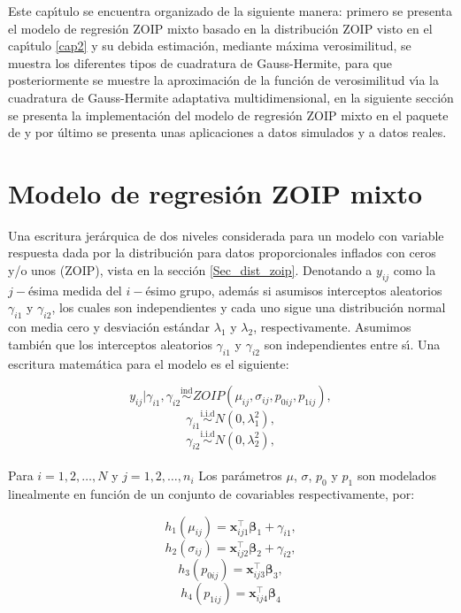 Este cap\'{\i}tulo se encuentra organizado de la siguiente manera: primero se presenta el modelo de regresi\'{o}n ZOIP mixto basado en la distribuci\'{o}n ZOIP visto en el cap\'{\i}tulo \ref{cap2} y su debida estimaci\'{o}n, mediante m\'{a}xima verosimilitud, se muestra los diferentes tipos de cuadratura de Gauss-Hermite, para que posteriormente se muestre la aproximaci\'{o}n de la funci\'{o}n de verosimilitud v\'{\i}a la cuadratura de Gauss-Hermite adaptativa multidimensional,  en la siguiente secci\'{o}n se presenta la implementaci\'{o}n del modelo de regresi\'{o}n ZOIP mixto en el paquete  de  y por \'{u}ltimo se presenta unas aplicaciones a datos simulados y a datos reales.



\section{Modelo de regresi\'{o}n ZOIP mixto}


Una escritura jer\'{a}rquica de dos niveles considerada para un modelo con variable respuesta dada por la distribuci\'{o}n para datos proporcionales inflados con ceros y/o unos (ZOIP), vista en la secci\'{o}n \ref{Sec_dist_zoip}. Denotando a $y_{ij}$ como la $j-$\'{e}sima medida del $i-$\'{e}simo grupo, adem\'{a}s si asumisos interceptos aleatorios $\gamma_{i1}$ y $\gamma_{i2}$, los cuales son independientes y cada uno sigue una distribuci\'{o}n normal con media cero y desviaci\'{o}n est\'{a}ndar $\lambda_1$ y $\lambda_2$, respectivamente. Asumimos tambi\'{e}n que los interceptos aleatorios $\gamma_{i1}$ y $\gamma_{i2}$ son independientes entre s\'{\i}. Una escritura matem\'{a}tica para el modelo es el siguiente:

\[
y_{ij}| \gamma_{i1},\gamma_{i2} \overset{\text{ind}}{\sim} ZOIP(\mu_{ij},\sigma_{ij},p_{0ij}, p_{1ij}),
\]
\[
\gamma_{i1} \overset{\text{i.i.d}}{\sim}  N(0,\lambda_1^2),
\]
\[
\gamma_{i2} \overset{\text{i.i.d}}{\sim}  N(0,\lambda_2^2),
\]
\\
Para $i=1,2,\ldots, N$ y $j=1,2,\ldots, n_i$ Los par\'{a}metros $\mu$, $\sigma$, $p_0$ y $p_1$ son modelados linealmente en funci\'{o}n de un conjunto de covariables respectivamente, por:


\[
h_1(\mu_{ij})=\mathbf{x}_{ij1}^{\top} \boldsymbol{\beta}_1+ \gamma_{i1},
\]
\[
h_2(\sigma_{ij})=\mathbf{x}_{ij2}^{\top} \boldsymbol{\beta}_2+ \gamma_{i2},
\]
\[
h_3(p_{0ij})=\mathbf{x}_{ij3}^{\top} \boldsymbol{\beta}_3,
\]
\[
h_4(p_{1ij})=\mathbf{x}_{ij4}^{\top} \boldsymbol{\beta}_4
\]


